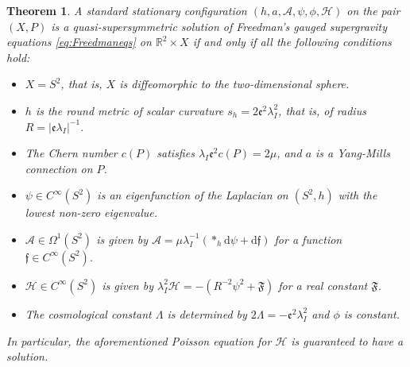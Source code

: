 \documentclass[10pt,a4paper]{amsart}
\newtheorem{thm}{Theorem}
\def\cA{\mathcal{A}}
\def\cH{\mathcal{H}}
\def\dd{\mathrm{d}}
\def\frc{\mathfrak{F}}
\begin{document}
\begin{thm}
\label{thm:NoGoFreedman}
A standard stationary configuration  $(h, a, \cA, \psi, \phi, \cH)$ on the pair $(X,P)$ is a quasi-supersymmetric solution of Freedman's gauged supergravity equations \eqref{eq:Freedmaneqs} on $\mathbb{R}^2 \times X$ if and only if all the following conditions hold:
\begin{itemize}
    \item $X = S^2$, that is, $X$ is diffeomorphic to the two-dimensional sphere.
    \item $h$ is the round metric of scalar curvature $s_h = 2 \mathfrak{e}^2 \lambda_I^2$, that is, of radius $R=\vert\mathfrak{e} \lambda_I\vert^{-1}$.
    \item The Chern number $c(P)$ satisfies $\lambda_I \mathfrak{e}^2 c(P) = 2\mu$, and $a$ is a Yang-Mills connection on $P$.  
    \item $\psi \in C^{\infty}(S^2)$ is an eigenfunction of the Laplacian on $(S^2,h)$ with the lowest non-zero eigenvalue. 
    \item $\cA \in \Omega^1(S^2)$ is given by $\cA = \mu \lambda^{-1}_I (\ast_h \dd \psi + \dd \mathfrak{f})$ for a function $\mathfrak{f}\in C^{\infty}(S^2)$.
    \item $\cH\in C^{\infty}(S^2)$ is given by $\lambda_I^2\cH = -(R^{-2}\psi^2 + \frc)$ for a real constant $\frc$.
    \item The cosmological constant $\Lambda$ is determined by $2\Lambda = -\mathfrak{e}^2 \lambda_I^2$ and $\phi$ is constant.
\end{itemize}
In particular, the aforementioned Poisson equation for $\cH$ is guaranteed to have a solution.
\end{thm}
\end{document}
